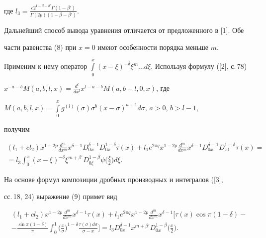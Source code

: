 где $l_3=\frac{c2^{1-\beta-\beta'}\Gamma(1-\beta')} 


{\Gamma(2p)(1-\beta-\beta')}$. 


 


Дальнейший способ вывода уравнения отличается от предложенного в [1]. Обе 


части равенства (8) при $x=0$ имеют особенности порядка меньше $m$. 


Применим к нему оператор $\int\limits^x_0(x-\xi)^{-\delta} \xi^m\dotsc 


d\xi$. Используя формулу ([2], с.\,78) 


$x^{-a-b}M(a,b,l,x)=\frac{d^l}{dx^l}x^{l-a-b}M(a,b-l,0,x)$, где 


$M(a,b,l,x)=\int\limits^x_0 g^{(l)}(\sigma)\sigma^b 


(x-\sigma)^{a-1}d\sigma$, $a>0$, $b>l-1$, 


получим 


\begin{multline} 


(l_1+cl_2)x^{1-2p}\frac{d^m}{dx^m}x^{\delta-1} 


D^{\delta-1}_{0x}D^{1-\delta}_{0x}\tau(x)+l_1e^{2\pi q} 


x^{1-2p}\frac{d^m}{dx^m}x^{\delta-1}D^{\delta-1}_{0x} 


D^{1-\delta}_{x1}\tau(x)=\\ 


% 


=l_3\int^x_0(x-\xi)^{-\delta}\xi^{m+\beta'}D^{1-\beta}_{0\xi} 


\psi\bigg(\frac{\xi}{2} \bigg)d\xi. 


\end{multline} 


На основе формул композиции дробных производных и интегралов ([3], 


сс.\,18, 24) выражение (9) примет вид 


\begin{multline*} 


(l_1+cl_2)x^{1-2p}\frac{d^m}{dx^m}x^{\delta-1}\tau(x) 


+l_1e^{2\pi q}x^{1-2p}\frac{d^m}{dx^m} 


x^{\delta-1}\bigg[\tau(x)\cos\pi(1-\delta)-\\ 


% 


-\frac{\sin\pi(1-\delta)}{\pi}\int^1_0\bigg(\frac{x}{\sigma} \bigg)^{1-\delta} 


\frac{\tau(\sigma)d\sigma}{\sigma-x}\bigg]=l_3D^{\delta-1}_{0x} 


x^{m+\beta'}D^{1-\beta}_{0x}\bigg(\frac{x}{2} \bigg). 


\end{multline*} 


